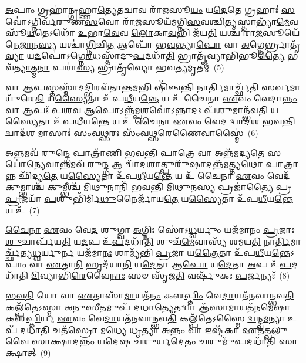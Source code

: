 {\anuvakamend[{\-\ul{𑌉}\-𑌨𑍍𑌦𑌨𑍍𑌤𑌿᳴ \ul{𑌸}\-𑌮𑌵᳴𑌲𑍍𑌗𑌤 𑌮\-\ul{𑌧𑍁}\-𑌪𑍃𑌚𑌾॑\-\ul{𑌮𑍍𑌮𑌾}\-𑌤\-\ul{𑌰𑍋} 𑌦𑍍𑌵𑌾𑌵𑌿𑍞᳴𑌶𑌤𑌿𑌶𑍍𑌚}]}%

\-\ul{𑌅}\-𑌪𑌾𑌂 𑌗𑍍𑌰𑌹𑌾॑𑌨𑍍𑌗𑍃𑌹𑍍𑌣𑌾\-\ul{𑌤𑍍𑌯𑍇}\-𑌤𑌦𑍍𑌵𑌾𑌵 𑌰𑌾᳴\-\ul{𑌜}\-𑌸𑍂\-\ul{𑌯𑌂} 𑌯\-\ul{𑌦𑍇}\-𑌤𑍇 𑌗𑍍𑌰𑌹𑌾𑌃॑ \ul{𑌸}\-𑌵𑍋॑\-𑌽𑌗𑍍𑌨𑌿𑌰𑍍𑌵᳴𑌰𑍁𑌣\-\ul{𑌸}\-𑌵𑍋 𑌰𑌾᳴\-\ul{𑌜}\-𑌸𑍂𑌯᳴𑌮𑌗𑍍𑌨𑌿\-\ul{𑌸}\-𑌵𑌶𑍍𑌚𑌿\-\ul{𑌤𑍍𑌯}\-𑌸𑍍𑌤𑌾𑌭𑍍𑌯𑌾᳴\-\ul{𑌮𑍇}\-𑌵 𑌸𑍂᳴\-\ul{𑌯}\-𑌤𑍇\-𑌽𑌥𑍋᳴ \ul{𑌉}\-𑌭𑌾\-\ul{𑌵𑍇}\-𑌵 \ul{𑌲𑍋}\-𑌕𑌾\-\ul{𑌵}\-𑌭𑌿 𑌜᳴𑌯\-\ul{𑌤𑌿} 𑌯𑌶𑍍𑌚᳴ 𑌰𑌾\-\ul{𑌜}\-𑌸𑍂𑌯𑍇᳴𑌨𑍇\-\ul{𑌜𑌾}\-𑌨\-\ul{𑌸𑍍𑌯} 𑌯𑌶𑍍𑌚𑌾॑\-\ul{𑌗𑍍𑌨𑌿}\-𑌚𑌿\-\ul{𑌤} 𑌆𑌪𑍋᳴ 𑌭\-\ul{𑌵}\-𑌨𑍍𑌤𑍍𑌯𑌾\-\ul{𑌪𑍋} 𑌵𑌾 \ul{𑌅}\-𑌗𑍍𑌨𑍇𑌰𑍍𑌭𑍍𑌰𑌾𑌤𑍃᳴\-\ul{𑌵𑍍𑌯𑌾} 𑌯\-\ul{𑌦}\-𑌪𑍋॑\-𑌽𑌗𑍍𑌨𑍇\-\ul{𑌰}\-𑌧𑌸𑍍𑌤𑌾᳴𑌦𑍁\-\ul{𑌪}\-𑌦𑌧𑌾᳴\-\ul{𑌤𑌿} 𑌭𑍍𑌰𑌾𑌤𑍃᳴𑌵𑍍𑌯𑌾𑌭𑌿𑌭𑍂\-\ul{𑌤𑍍𑌯𑍈} 𑌭𑌵᳴\-\ul{𑌤𑍍𑌯𑌾}\-𑌤𑍍𑌮\-\ul{𑌨𑌾} 𑌪𑌰𑌾॑\-\ul{𑌸𑍍𑌯} 𑌭𑍍𑌰𑌾𑌤𑍃᳴𑌵𑍍𑌯𑍋 𑌭𑌵\-\ul{𑌤𑍍𑌯}\-𑌮𑍃𑌤𑌮𑍍॑~(5)

𑌵𑌾 𑌆\-\ul{𑌪}\-𑌸𑍍𑌤𑌸𑍍𑌮𑌾᳴\-\ul{𑌦}\-𑌦𑍍𑌭𑌿𑌰𑌵᳴𑌤𑌾𑌨𑍍𑌤\-\ul{𑌮}\-𑌭𑌿 𑌷𑌿᳴𑌞𑍍𑌚\-\ul{𑌨𑍍𑌤𑌿} 𑌨𑌾\-\ul{𑌰𑍍𑌤𑌿}\-𑌮𑌾𑌰𑍍𑌚𑍍𑌛᳴\-\ul{𑌤𑌿} 𑌸\-\ul{𑌰𑍍𑌵}\-𑌮𑌾𑌯𑍁᳴𑌰𑍇\-\ul{𑌤𑌿} 𑌯\-\ul{𑌸𑍍𑌯𑍈}\-𑌤𑌾 𑌉᳴𑌪\-\ul{𑌧𑍀}\-𑌯\-\ul{𑌨𑍍𑌤𑍇} 𑌯 𑌉᳴ 𑌚𑍈𑌨𑌾 \ul{𑌏}\-𑌵𑌂 𑌵𑍇𑌦𑌾\-\ul{𑌨𑍍𑌨𑌂} 𑌵𑌾 𑌆𑌪𑌃᳴ \ul{𑌪}\-𑌶\-\ul{𑌵} 𑌆𑌪𑍋\-𑌽𑌨𑍍𑌨᳴\-\ul{𑌮𑍍𑌪}\-𑌶𑌵𑍋॑\-𑌽\-\ul{𑌨𑍍𑌨𑌾}\-𑌦𑌃 𑌪᳴\-\ul{𑌶𑍁}\-𑌮𑌾𑌨𑍍𑌭᳴𑌵\-\ul{𑌤𑌿} 𑌯\-\ul{𑌸𑍍𑌯𑍈}\-𑌤𑌾 𑌉᳴𑌪\-\ul{𑌧𑍀}\-𑌯\-\ul{𑌨𑍍𑌤𑍇} 𑌯 𑌉᳴ 𑌚𑍈𑌨𑌾 \ul{𑌏}\-𑌵𑌂 𑌵𑍇\-\ul{𑌦} 𑌦𑍍𑌵𑌾𑌦᳴𑌶 𑌭𑌵\-\ul{𑌨𑍍𑌤𑌿} 𑌦𑍍𑌵𑌾𑌦᳴\-\ul{𑌶} 𑌮𑌾𑌸𑌾𑌃॑ 𑌸𑌂𑌵\-\ul{𑌥𑍍𑌸}\-𑌰𑌃 𑌸𑌂᳴𑌵\-\ul{𑌥𑍍𑌸}\-𑌰𑍇\-\ul{𑌣𑍈}\-𑌵𑌾𑌸𑍍𑌮𑍈॑~(6)

𑌅\-\ul{𑌨𑍍𑌨}\-𑌮𑌵᳴ 𑌰𑍁\-\ul{𑌨𑍍𑌦𑍍𑌧𑍇} 𑌪𑌾𑌤𑍍𑌰𑌾᳴𑌣𑌿 𑌭𑌵\-\ul{𑌨𑍍𑌤𑌿} 𑌪𑌾\-\ul{𑌤𑍍𑌰𑍇} 𑌵𑌾 𑌅𑌨𑍍𑌨᳴𑌮𑌦𑍍𑌯\-\ul{𑌤𑍇} 𑌸𑌯𑍋॑\-\ul{𑌨𑍍𑌯𑍇}\-𑌵𑌾\-\ul{𑌨𑍍𑌨}\-𑌮𑌵᳴ 𑌰𑍁\-\ul{𑌨𑍍𑌦𑍍𑌧} 𑌆 𑌦𑍍𑌵𑌾᳴\-\ul{𑌦}\-𑌶𑌾𑌤𑍍𑌪𑍁𑌰𑍁᳴\-\ul{𑌷𑌾}\-𑌦𑌨𑍍𑌨᳴\-\ul{𑌮}\-𑌤𑍍𑌤𑍍𑌯\-\ul{𑌥𑍋} 𑌪𑌾\-\ul{𑌤𑍍𑌰𑌾}\-𑌨𑍍𑌨 𑌛𑌿᳴𑌦𑍍𑌯\-\ul{𑌤𑍇} 𑌯\-\ul{𑌸𑍍𑌯𑍈}\-𑌤𑌾 𑌉᳴𑌪\-\ul{𑌧𑍀}\-𑌯\-\ul{𑌨𑍍𑌤𑍇} 𑌯 𑌉᳴ 𑌚𑍈𑌨𑌾 \ul{𑌏}\-𑌵𑌂 𑌵𑍇𑌦᳴ \ul{𑌕𑍁}\-𑌮𑍍𑌭𑌾𑌶𑍍𑌚᳴ \ul{𑌕𑍁}\-𑌮𑍍𑌭𑍀𑌶𑍍𑌚᳴ 𑌮𑌿\-\ul{𑌥𑍁}\-𑌨𑌾𑌨𑌿᳴ 𑌭𑌵𑌨𑍍𑌤𑌿 𑌮𑌿\-\ul{𑌥𑍁}\-𑌨\-\ul{𑌸𑍍𑌯} 𑌪𑍍𑌰𑌜𑌾॑\-\ul{𑌤𑍍𑌯𑍈} 𑌪𑍍𑌰 \ul{𑌪𑍍𑌰}\-𑌜𑌯𑌾᳴ \ul{𑌪}\-𑌶𑍁𑌭𑌿᳴𑌰𑍍𑌮𑌿\-\ul{𑌥𑍁}\-𑌨𑍈𑌰𑍍𑌜𑌾᳴𑌯\-\ul{𑌤𑍇} 𑌯\-\ul{𑌸𑍍𑌯𑍈}\-𑌤𑌾 𑌉᳴𑌪\-\ul{𑌧𑍀}\-𑌯\-\ul{𑌨𑍍𑌤𑍇} 𑌯 𑌉᳴~(7)

\-\ul{𑌚𑍈}\-\-\ul{𑌨𑌾} \ul{𑌏}\-𑌵𑌂 𑌵𑍇\-\ul{𑌦} 𑌶𑍁𑌗𑍍𑌵𑌾 \ul{𑌅}\-𑌗𑍍𑌨𑌿𑌃 𑌸𑍋॑\-𑌽\-\ul{𑌧𑍍𑌵}\-𑌰𑍍𑌯𑍁𑌂 𑌯𑌜᳴𑌮𑌾𑌨𑌂 \ul{𑌪𑍍𑌰}\-𑌜𑌾𑌃 \ul{𑌶𑍁}\-𑌚𑌾𑌰𑍍𑌪᳴𑌯\-\ul{𑌤𑌿} 𑌯\-\ul{𑌦}\-𑌪 𑌉᳴\-\ul{𑌪}\-𑌦𑌧𑌾᳴\-\ul{𑌤𑌿} 𑌶𑍁𑌚᳴\-\ul{𑌮𑍇}\-𑌵𑌾𑌸𑍍𑌯᳴ 𑌶𑌮𑌯\-\ul{𑌤𑌿} 𑌨𑌾\-\ul{𑌰𑍍𑌤𑌿}\-𑌮𑌾𑌰𑍍𑌚𑍍𑌛᳴𑌤𑍍𑌯\-\ul{𑌧𑍍𑌵}\-𑌰𑍍𑌯𑍁𑌰𑍍𑌨 𑌯𑌜᳴𑌮𑌾\-\ul{𑌨𑌃} 𑌶𑌾𑌮𑍍𑌯᳴𑌨𑍍𑌤𑌿 \ul{𑌪𑍍𑌰}\-𑌜𑌾 𑌯\-\ul{𑌤𑍍𑌰𑍈}\-𑌤𑌾 𑌉᳴𑌪\-\ul{𑌧𑍀}\-𑌯\-\ul{𑌨𑍍𑌤𑍇}\-\-𑌽𑌪𑌾𑌂 𑌵𑌾 \ul{𑌏}\-𑌤𑌾\-\ul{𑌨𑌿} 𑌹𑍃𑌦᳴𑌯𑌾\-\ul{𑌨𑌿} 𑌯\-\ul{𑌦𑍇}\-𑌤𑌾 𑌆\-\ul{𑌪𑍋} 𑌯\-\ul{𑌦𑍇}\-𑌤𑌾 \ul{𑌅}\-𑌪 𑌉᳴\-\ul{𑌪}\-𑌦𑌧𑌾᳴𑌤𑌿 \ul{𑌦𑌿}\-𑌵𑍍𑌯𑌾𑌭𑌿᳴\-\ul{𑌰𑍇}\-𑌵𑍈\-\ul{𑌨𑌾𑌃} 𑌸𑍞 𑌸𑍃᳴𑌜\-\ul{𑌤𑌿} 𑌵𑌰𑍍\mbox{}𑌷𑍁᳴𑌕𑌃 \ul{𑌪}\-𑌰𑍍𑌜𑌨𑍍𑌯𑌃᳴~(8)

\-\ul{𑌭}\-\-\ul{𑌵}\-\-\ul{𑌤𑌿} 𑌯𑍋 𑌵𑌾 \ul{𑌏}\-𑌤𑌾𑌸𑌾᳴\-\ul{𑌮𑌾}\-𑌯𑌤᳴\-\ul{𑌨𑌂} 𑌕𑍢\-\ul{𑌪𑍍𑌤𑌿𑌂} 𑌵𑍇\-\ul{𑌦𑌾}\-𑌯𑌤᳴𑌨𑌵𑌾𑌨𑍍𑌭𑌵\-\ul{𑌤𑌿} 𑌕𑌲𑍍𑌪᳴𑌤𑍇\-𑌽𑌸𑍍𑌮𑌾 𑌅𑌨𑍁\-\ul{𑌸𑍀}\-𑌤𑌮𑍁𑌪᳴ 𑌦𑌧𑌾\-\ul{𑌤𑍍𑌯𑍇}\-𑌤𑌦𑍍𑌵𑌾 𑌆᳴𑌸𑌾\-\ul{𑌮𑌾}\-𑌯𑌤᳴𑌨\-\ul{𑌮𑍇}\-𑌷𑌾 𑌕𑍢\-\ul{𑌪𑍍𑌤𑌿}\-𑌰𑍍𑌯 \ul{𑌏}\-𑌵𑌂 𑌵𑍇\-\ul{𑌦𑌾}\-𑌯𑌤᳴𑌨𑌵𑌾𑌨𑍍𑌭𑌵\-\ul{𑌤𑌿} 𑌕𑌲𑍍𑌪᳴𑌤𑍇\-𑌽𑌸𑍍𑌮𑍈 \ul{𑌦𑍍𑌵}\-𑌨𑍍𑌦𑍍𑌵\-\ul{𑌮}\-𑌨𑍍𑌯𑌾 𑌉𑌪᳴ 𑌦𑌧𑌾\-\ul{𑌤𑌿} 𑌚𑌤᳴\-\ul{𑌸𑍍𑌰𑍋} 𑌮\-\ul{𑌧𑍍𑌯𑍇} 𑌧𑍃\-\ul{𑌤𑍍𑌯𑌾} 𑌅\-\ul{𑌨𑍍𑌨𑌂} 𑌵𑌾 𑌇𑌷𑍍𑌟᳴𑌕𑌾 \ul{𑌏}\-𑌤𑌤𑍍𑌖\-\ul{𑌲𑍁} 𑌵𑍈 \ul{𑌸𑌾}\-𑌕𑍍𑌷𑌾𑌦\-\ul{𑌨𑍍𑌨𑌂} 𑌯\-\ul{𑌦𑍇}\-𑌷 \ul{𑌚}\-𑌰𑍁𑌰𑍍𑌯\-\ul{𑌦𑍇}\-𑌤𑌂 \ul{𑌚}\-𑌰𑍁𑌮𑍁᳴\-\ul{𑌪}\-𑌦𑌧𑌾᳴𑌤𑌿 \ul{𑌸𑌾}\-𑌕𑍍𑌷𑌾𑌤𑍍~(9)

